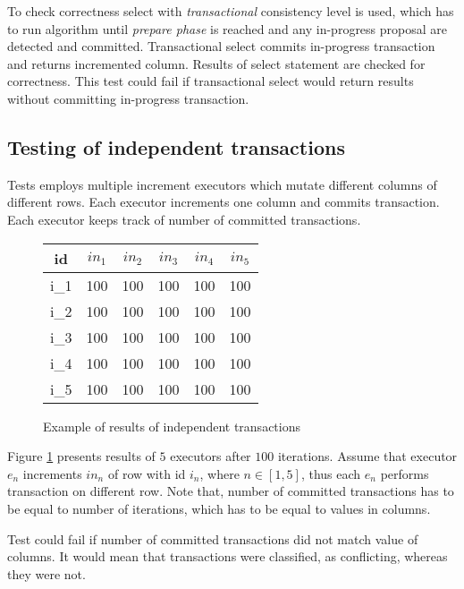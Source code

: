  To check correctness select with \emph{transactional} consistency level is used, which has to run \mpt algorithm until \emph{prepare phase} is reached and any in-progress proposal are detected and committed.
Transactional select commits in-progress transaction and returns incremented column. Results of select statement are checked for correctness. This test could fail if transactional select would return results without committing in-progress transaction.

\subsection{Testing of independent transactions}
Tests employs multiple increment executors which mutate different columns of different rows. 
Each executor increments one column and commits transaction. Each executor keeps track of number of committed transactions. 

\begin{figure}[h]
\centering
\begin{tabular}{c||c|c|c|c|c}
        \toprule
        id & $in_{1}$ & $in_{2}$ & $in_{3}$ & $in_{4}$ & $in_{5}$ \\ \midrule
        i_1 &   100        & 100        & 100        &  100       & 100        \\
        i_2 &   100        & 100        & 100        &  100       & 100        \\
        i_3 &   100        & 100        & 100        &  100       & 100        \\
        i_4 &   100        & 100        & 100        &  100       & 100        \\        
        i_5 &   100        & 100        & 100        &  100       & 100        \\  \bottomrule
      \end{tabular}
      \caption{Example of results of independent transactions}
  \label{fig:exampleIndependentTransactions}
\end{figure}

Figure \ref{fig:exampleIndependentTransactions} presents results of $5$ executors after $100$ iterations. 
Assume that executor $e_n$ increments $in_n$ of row with id $i_n$, where $n\in [1,5]$, thus each $e_n$ performs transaction on different row.
Note that, number of committed transactions has to be equal to number of iterations, which has to be equal to values in columns.

Test could fail if number of committed transactions did not match value of columns. It would mean that transactions were classified, as conflicting, whereas they were not.

